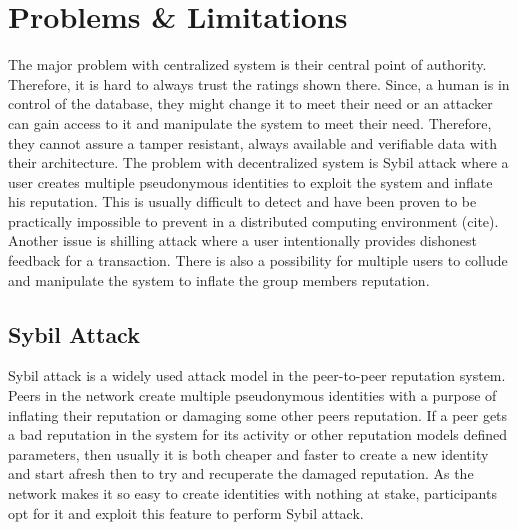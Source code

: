 \section{Problems \& Limitations}
The major problem with centralized system is their central point of authority. Therefore, 
it is hard to always trust the ratings shown there. Since, a human is in control of 
the database, they might change it to meet their need or an attacker can gain access 
to it and manipulate the system to meet their need. Therefore, they cannot assure a 
tamper resistant, always available and verifiable data with their architecture. 
The problem with decentralized system is Sybil attack where a user creates multiple 
pseudonymous identities to exploit the system and inflate his reputation. This is 
usually difficult to detect and have been proven to be practically impossible to 
prevent in a distributed computing environment (cite). Another issue is shilling attack 
where a user intentionally provides dishonest feedback for a transaction. There is also 
a possibility for multiple users to collude and manipulate the system to inflate the 
group members reputation. 

\subsection{Sybil Attack}
Sybil attack is a widely used attack model in the peer-to-peer 
reputation system. Peers in the network create multiple 
pseudonymous identities with a purpose of inflating their 
reputation or damaging some other peers reputation. If a peer gets
a bad reputation in the system for its activity or other reputation
models defined parameters, then usually it is both cheaper and  
faster to create a new identity and start afresh then to try and 
recuperate the damaged reputation. As the network makes it so easy
to create identities with nothing at stake, participants opt for it 
and exploit this feature to perform Sybil attack. 

